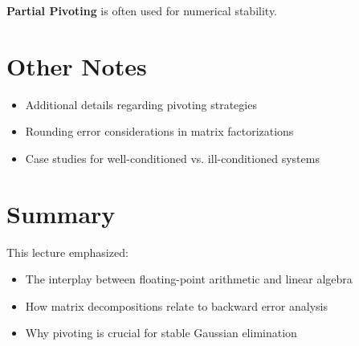 \documentclass[12pt]{article}
\begin{document}
\noindent
\textbf{Partial Pivoting} is often used for numerical stability. 

\section*{Other Notes}
\begin{itemize}
    \item Additional details regarding pivoting strategies
    \item Rounding error considerations in matrix factorizations
    \item Case studies for well-conditioned vs. ill-conditioned systems
\end{itemize}

\section*{Summary}
This lecture emphasized:
\begin{itemize}
    \item The interplay between floating-point arithmetic and linear algebra
    \item How matrix decompositions relate to backward error analysis
    \item Why pivoting is crucial for stable Gaussian elimination
\end{itemize}
\end{document}
